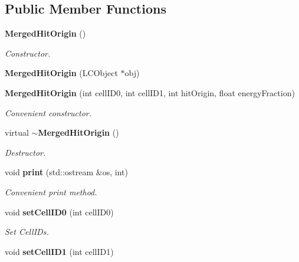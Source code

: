 \subsection*{Public Member Functions}
\begin{DoxyCompactItemize}
\item 
{\bf Merged\-Hit\-Origin} ()\label{classCALICE_1_1MergedHitOrigin_a15306a09e41cdff0877ac0ddf8cbd7f2}

\begin{DoxyCompactList}\small\item\em Constructor. \end{DoxyCompactList}\item 
{\bfseries Merged\-Hit\-Origin} (L\-C\-Object $\ast$obj)\label{classCALICE_1_1MergedHitOrigin_ae4f1c06476db96f2757575da72a6a52e}

\item 
{\bf Merged\-Hit\-Origin} (int cell\-I\-D0, int cell\-I\-D1, int hit\-Origin, float energy\-Fraction)\label{classCALICE_1_1MergedHitOrigin_affcb419cfac060a391f0a3eedf751aec}

\begin{DoxyCompactList}\small\item\em Convenient constructor. \end{DoxyCompactList}\item 
virtual {\bf $\sim$\-Merged\-Hit\-Origin} ()\label{classCALICE_1_1MergedHitOrigin_aec8dfe17dcacb6793d66e0f4618683f5}

\begin{DoxyCompactList}\small\item\em Destructor. \end{DoxyCompactList}\item 
void {\bf print} (std\-::ostream \&os, int)\label{classCALICE_1_1MergedHitOrigin_ab783bcacde2f54187fd6b3c1578cb93a}

\begin{DoxyCompactList}\small\item\em Convenient print method. \end{DoxyCompactList}\item 
void {\bf set\-Cell\-I\-D0} (int cell\-I\-D0)\label{classCALICE_1_1MergedHitOrigin_a27f722b021e9e123b69262d5e3696fde}

\begin{DoxyCompactList}\small\item\em Set Cell\-I\-Ds. \end{DoxyCompactList}\item 
void {\bfseries set\-Cell\-I\-D1} (int cell\-I\-D1)\label{classCALICE_1_1MergedHitOrigin_a0dbbcea2155027b506a8f0ce57f5fdcc}


\end{DoxyCompactItemize}
